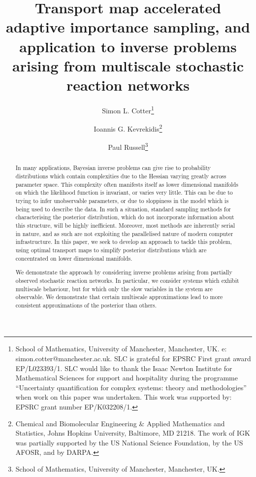 \documentclass[final]{siamltex}
\author{Simon L. Cotter\thanks{School of
    Mathematics, University of Manchester, Manchester, UK. e:
    simon.cotter@manchester.ac.uk. SLC is grateful for EPSRC First
    grant award EP/L023393/1. SLC would like to thank the Isaac Newton
    Institute for Mathematical Sciences for support and hospitality
    during the programme ``Uncertainty quantification for complex systems: theory and methodologies'' when work on this paper was undertaken. This work was supported by:
EPSRC grant number EP/K032208/1.} \and Ioannis
G. Kevrekidis\thanks{Chemical and Biomolecular Engineering \& Applied
  Mathematics and Statistics, Johns Hopkins University, Baltimore, MD
  21218. The work of IGK was partially supported by the US National
  Science Foundation, by the US AFOSR, and by DARPA.} \and Paul
  Russell\thanks{School of
    Mathematics, University of Manchester, Manchester, UK.}}
\title{Transport map accelerated adaptive importance sampling, and application to inverse problems arising from
  multiscale stochastic reaction networks}
\begin{document}
\maketitle
\begin{abstract}
In many applications, Bayesian inverse problems can give rise to
probability distributions which contain complexities due to the
Hessian varying greatly across parameter space. This complexity often manifests itself as lower
dimensional manifolds on which the likelihood function is
invariant, or varies very little. This can be due to trying to infer
unobservable parameters, or due to sloppiness in the model which is
being used to describe the data. In such a situation, standard
sampling methods for characterising the posterior distribution, which
do not incorporate information about this structure, will be highly
inefficient. Moreover, most methods are inherently serial in nature,
and as such are not exploiting the parallelised  nature of modern
computer infrastructure. In this paper, we seek to develop an approach to
tackle this problem, using optimal transport maps to simplify
posterior distributions which are concentrated on lower dimensional
manifolds.

We demonstrate the approach by considering inverse problems arising
from partially observed stochastic reaction networks. In particular,
we consider systems which exhibit multiscale behaviour, but for which
only the slow variables in the system are observable. We demonstrate
that certain multiscale approximations lead to more consistent
approximations of the posterior than others.
\end{abstract}
\end{document}
